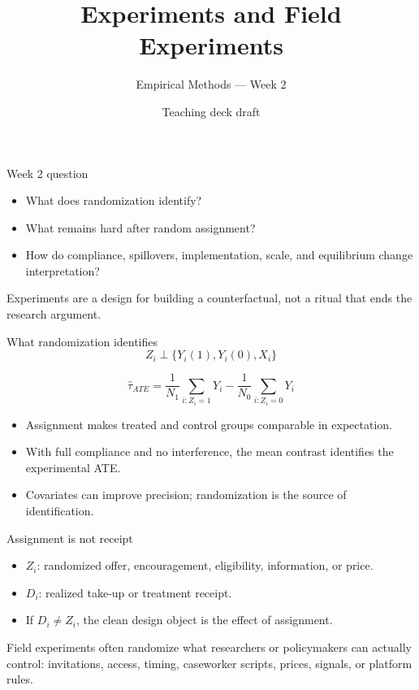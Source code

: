 \documentclass[aspectratio=169,11pt]{beamer}
\title{Experiments and Field Experiments}
\subtitle{Empirical Methods --- Week 2}
\author{Teaching deck draft}
\date{}
\begin{document}
\begin{frame}
  \titlepage
\end{frame}

\begin{frame}{Week 2 question}
\begin{itemize}
    \item What does randomization identify?
    \item What remains hard after random assignment?
    \item How do compliance, spillovers, implementation, scale, and equilibrium change interpretation?
\end{itemize}

\medskip
Experiments are a design for building a counterfactual, not a ritual that ends the research argument.
\end{frame}

\begin{frame}{What randomization identifies}
\[
Z_i \perp \{Y_i(1),Y_i(0),X_i\}
\]

\[
\widehat{\tau}_{ATE}
=
\frac{1}{N_1}\sum_{i:Z_i=1}Y_i
-
\frac{1}{N_0}\sum_{i:Z_i=0}Y_i
\]

\begin{itemize}
    \item Assignment makes treated and control groups comparable in expectation.
    \item With full compliance and no interference, the mean contrast identifies the experimental ATE.
    \item Covariates can improve precision; randomization is the source of identification.
\end{itemize}
\end{frame}

\begin{frame}{Assignment is not receipt}
\begin{itemize}
    \item $Z_i$: randomized offer, encouragement, eligibility, information, or price.
    \item $D_i$: realized take-up or treatment receipt.
    \item If $D_i \neq Z_i$, the clean design object is the effect of assignment.
\end{itemize}

\medskip
Field experiments often randomize what researchers or policymakers can actually control: invitations, access, timing, caseworker scripts, prices, signals, or platform rules.
\end{frame}
\end{document}
